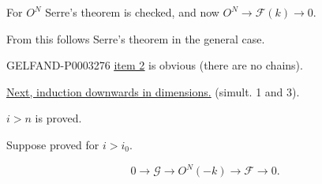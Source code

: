 For $O^N$ Serre’s theorem is checked, and now $O^N\longrightarrow\mathcal F (k)\longrightarrow0$.

From this follows Serre’s theorem in the general case.

\begin{GelfandAdjacentEvidence}{GELFAND-P000327}{6}
\uline{\uline{item 2}} is obvious (there are no chains).





\end{GelfandAdjacentEvidence}


\uline{Next, induction downwards in dimensions.} (simult. 1 and 3).

$i>n$ is proved.

Suppose proved for $i>i_0$.

\begin{equation*}0\longrightarrow\mathcal G\longrightarrow O^N (-k)\longrightarrow\mathcal F\longrightarrow0.\end{equation*}

